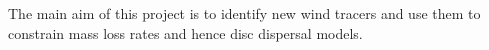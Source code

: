 



\vspace{0.5em}

The main aim of this project is to identify new wind tracers and use them to constrain mass loss rates and hence disc dispersal models.

\vspace{0.5em}

